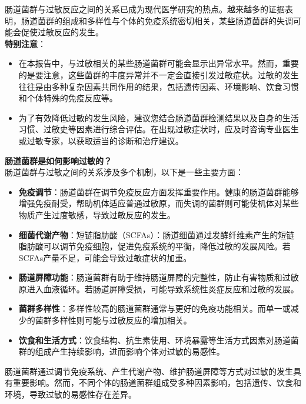 \documentclass[UTF8]{ctexart}
\begin{document}
\begin{tcolorbox}[
    enhanced,
    colback=customTealBg,
    colframe=customTealBg,
    arc=3mm,
    boxrule=0pt,
    width=\textwidth,
    top=8pt,
    bottom=8pt
]
{\small{\color{customTeal}\faInfoCircle} 肠道菌群与过敏反应之间的关系已成为现代医学研究的热点。越来越多的证据表明，肠道菌群的组成和多样性与个体的免疫系统密切相关，某些肠道菌群的失调可能会促使过敏反应的发生。\\

{\color{orange}\faExclamationTriangle} \textbf{特别注意}：
\begin{itemize}
    \item 在本报告中，与过敏相关的某些肠道菌群可能会显示出异常水平。然而，重要的是要注意，这些菌群的丰度异常并不一定会直接引发过敏症状。过敏的发生往往是由多种复杂因素共同作用的结果，包括遗传因素、环境影响、饮食习惯和个体特殊的免疫反应等。
    \item 为了有效降低过敏的发生风险，建议您结合肠道菌群检测结果以及自身的生活习惯、过敏史等因素进行综合评估。在出现过敏症状时，应及时咨询专业医生或过敏专家，以获取适当的诊断和治疗建议。
\end{itemize}
}
\end{tcolorbox}

\begin{tcolorbox}[
    enhanced,
    colback=lightpurple!10, %
    colframe=lightpurple!10,  %
    arc=3mm,
    boxrule=0.5pt,
    width=\textwidth,
    top=8pt,
    bottom=8pt
]
{\small{\color{lightpurple}\faQuestionCircle}\quad \textbf{肠道菌群是如何影响过敏的？}\\
{\color{orange!50}\faComments}\quad 肠道菌群与过敏之间的关系涉及多个机制，以下是一些主要方面：
\begin{itemize}
    \item \textbf{免疫调节}：肠道菌群在调节免疫反应方面发挥重要作用。健康的肠道菌群能够增强免疫耐受，帮助机体适应普通过敏原，而失调的菌群则可能使机体对某些物质产生过度敏感，导致过敏反应的发生。
    \item \textbf{细菌代谢产物}：短链脂肪酸（SCFAs）：肠道细菌通过发酵纤维素产生的短链脂肪酸可以调节免疫细胞，促进免疫系统的平衡，降低过敏的发展风险。若SCFAs产量不足，可能会导致过敏症状的加重。
    \item \textbf{肠道屏障功能}：肠道菌群有助于维持肠道屏障的完整性，防止有害物质和过敏原进入血液循环。若肠道屏障受损，可能导致系统性炎症反应和过敏的发展。
    \item \textbf{菌群多样性}：多样性较高的肠道菌群通常与更好的免疫功能相关。而单一或减少的菌群多样性则可能与过敏反应的增加相关。
    \item \textbf{饮食和生活方式}：饮食结构、抗生素使用、环境暴露等生活方式因素对肠道菌群的组成产生持续影响，进而影响个体对过敏的易感性。
\end{itemize}
肠道菌群通过调节免疫系统、产生代谢产物、维护肠道屏障等方式对过敏的发生具有重要影响。然而，不同个体的肠道菌群组成受多种因素影响，包括遗传、饮食和环境，导致过敏的易感性存在差异。
}
\end{tcolorbox}
\end{document}
